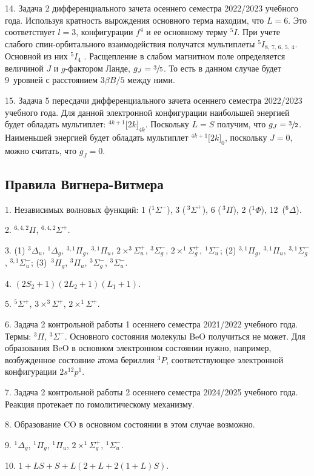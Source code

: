 14. Задача 2 дифференциального зачета осеннего семестра 2022/2023 учебного года. Используя кратность вырождения основного терма находим, что $L=6$. Это соответствует $l=3$, конфигурации $f^4$ и ее основному терму $^5I$. При учете слабого спин-орбитального взаимодействия получатся мультиплеты $^5I_{8,\,7,\,6,\,5,\,4}$. Основной из них $^5I_4$ . Расщепление в слабом магнитном поле определяется величиной $J$ и $g$-фактором Ланде, $g_J=\sfrac35$. То есть в данном случае будет 9~уровней с расстоянием $3 \beta B/5$ между ними.\par
15. Задача 5 пересдачи дифференциального зачета осеннего семестра 2022/2023 учебного года. Для данной электронной конфигурации наибольшей энергией будет обладать мультиплет: $^{4k+1}\Big[ 2k \Big] _{4k}$. Поскольку $L=S$ получим, что $g_{J} = \sfrac{3}{2}$. Наименьшей энергией будет обладать мультиплет $^{4k+1}\Big[ 2k \Big] _{0}$, поскольку $J=0$, можно считать, что $g_{J}=0$.\par
\newpage

\subsection{Правила Вигнера-Витмера}
1. Независимых волновых функций: 1 ($^1\Sigma^-$), 3 ($\,^3\Sigma^+$), 6 ($\,^3\Pi$), 2 ($^1\Phi$), 12~($^6\Delta$). \par
2.  $^{6,4,2}\Pi$,  $^{6,4,2}\Sigma^+$.\par
3. (1) $^3\Delta_u$, $^1\Delta_g$, $^{3,1}\Pi_g$, $^{3,1}\Pi_u$, $2 \times ^{3}\Sigma_u^+$, $^3\Sigma^-_g$, $2 \times ^{1}\Sigma_g^+$, $^{1}\Sigma_u^-$; (2) $^{3,1}\Pi_g$, $^{3,1}\Pi_u$, $^{3,1}\Sigma^-_g$, $^{3,1}\Sigma^-_u$; (3)~$^3\Pi_g$, $^3\Pi_u$, $^3\Sigma^-_g$, $^3\Sigma^-_u$.\par
4. $(2S_2+1)(2L_2+1)(L_1+1).$\par
5.  $^{5}\Sigma^+$, $3 \times ^{3}\Sigma^+$, $2 \times ^{1}\Sigma^+$.\par
6. Задача 2 контрольной работы 1 осеннего семестра 2021/2022 учебного года. Термы: $^3\Pi$, $^3\Sigma^-$. Основного состояния молекулы BeO получиться не может. Для образования BeO в основном электронном состоянии нужно, например, возбужденное состояние атома бериллия $^3P$, соответствующее электронной конфигурации $2s^12p^1$.\par
7. Задача 2 контрольной работы 2 осеннего семестра 2024/2025 учебного года. Реакция протекает по гомолитическому механизму.\par
8. Образование CO в основном состоянии в этом случае возможно.\par
9. $^1\Delta_g$, $^1\Pi_g$, $^1\Pi_u$, $2 \times ^1\Sigma^+_g$, $^1\Sigma^-_u$.\par
10. $1 + LS + S + L(2 + L + 2(1 + L)S)$.\par
\newpage

